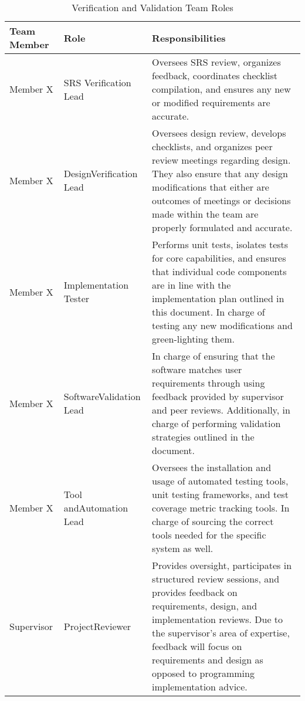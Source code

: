 \documentclass[12pt, titlepage]{article}
\begin{document}
\begin{table}[H]
  \centering
  \begin{adjustbox}{max width=0.9\textwidth} 
    \begin{tabularx}{\linewidth}{|p{2.5cm}|p{2.75cm}|X|} 
    \hline
    \textbf{Team Member} & \textbf{Role} & \textbf{Responsibilities} \\ \hline
    Member X & SRS Verification Lead & Oversees SRS review, organizes feedback, coordinates checklist compilation, and ensures any new or modified requirements are accurate. \\ \hline
    Member X & Design\newline Verification Lead & Oversees design review, develops checklists, and organizes peer review meetings regarding design. They also ensure that any design modifications that either are outcomes of meetings or decisions made within the team are properly formulated and accurate.  \\ \hline
    Member X & Implementation Tester & Performs unit tests, isolates tests for core capabilities, and ensures that individual code components are in line with the implementation plan outlined in this document. In charge of testing any new modifications and green-lighting them. \\ \hline
    Member X & Software\newline Validation Lead & In charge of ensuring that the software matches user requirements through using feedback provided by supervisor and peer reviews. Additionally, in charge of performing validation strategies outlined in the document. \\ \hline
    Member X & Tool and\newline Automation Lead & Oversees the installation and usage of automated testing tools, unit testing frameworks, and test coverage metric tracking tools. In charge of sourcing the correct tools needed for the specific system as well. \\ \hline
    Supervisor & Project\newline Reviewer & Provides oversight, participates in structured review sessions, and provides feedback on requirements, design, and implementation reviews. Due to the supervisor's area of expertise, feedback will focus on requirements and design as opposed to programming implementation advice. \\ \hline
    \end{tabularx}
  \end{adjustbox}
  \caption{Verification and Validation Team Roles}
  \label{tab:team}
\end{table}
\end{document}
